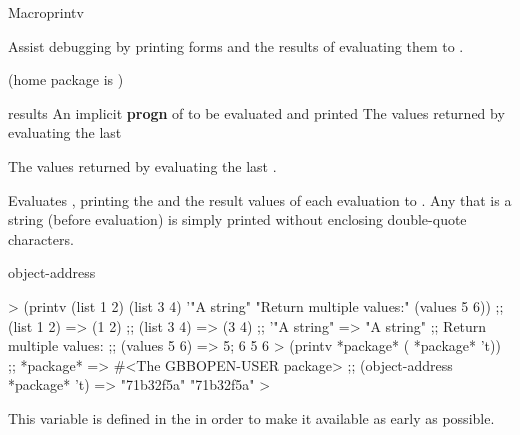 \documentclass[10pt,twoside,english,pdftex]{article}
\begin{document}
\begin{functiondoc}{Macro}{printv}{\superstar{} 
    \returns{} \superstar}
% 

\fnsyntax

\fnpurpose Assist debugging by printing forms and the results of
evaluating them to .

\fnpackage {} (home package is )

\fnmodule {}

\fnargs
\begin{args}{results}
\arg[forms] An implicit \textbf{progn} of  to be
evaluated and printed  
\arg[results] The values returned by evaluating the last 
\end{args}

\fnreturns The values returned by evaluating the last .

\fndescription Evaluates , printing the  and the
result values of each evaluation to .  Any 
that is a string (before evaluation) is simply printed without enclosing
double-quote characters.

\begin{alsos}{object-address}
\end{alsos}

%
\fnexamples
%
\W\supp
\begin{example}
  > (printv (list 1 2) (list 3 4) '"A string" 
            "Return multiple values:" (values 5 6))
  ;;  (list 1 2) => (1 2)
  ;;  (list 3 4) => (3 4)
  ;;  '"A string" => "A string"
  ;; Return multiple values:
  ;;  (values 5 6) => 5; 6
  5
  6\goodpagebreak
  > (printv *package* ( *package* 't))
  ;;  *package* => #<The GBBOPEN-USER package>
  ;;  (object-address *package* 't) => "71b32f5a"
  "71b32f5a"
  >
\end{example}

\fnnote
{}%
%
%
This variable is defined in the   in order to
make it available as early as possible.

\end{functiondoc}

\end{document}
